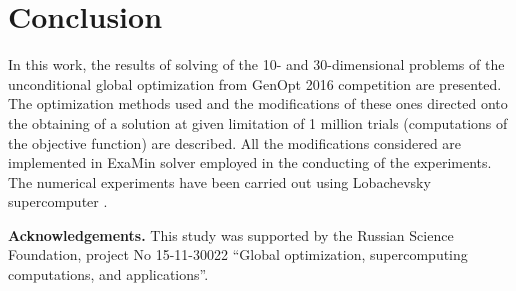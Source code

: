 \documentclass{llncs}
\begin{document}
\section{Conclusion}
In this work, the results of solving of the 10- and 30-dimensional problems of the unconditional global optimization from GenOpt 2016 competition are presented. The optimization methods used and the modifications of these ones directed onto the obtaining of a solution at given limitation of 1 million trials (computations of the objective function) are described. All the modifications considered are implemented in ExaMin solver employed in the conducting of the experiments. The numerical experiments have been carried out using Lobachevsky supercomputer \cite{Lobach}.


\textbf{Acknowledgements.} This study was supported by the Russian Science Foundation, project No 15-11-30022 ``Global optimization, supercomputing computations, and applications''.
\end{document}
